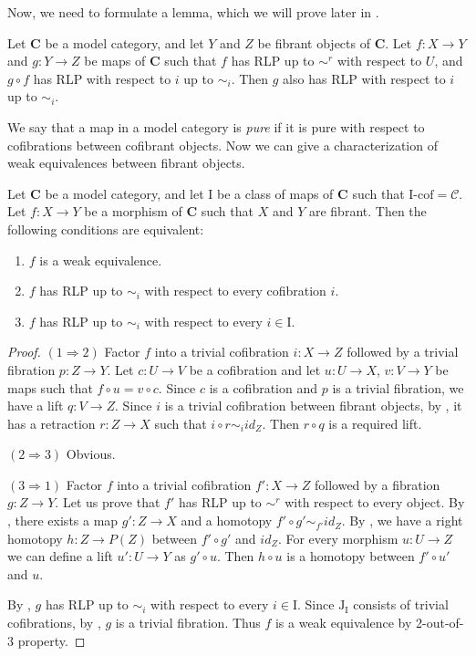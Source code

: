 \documentclass{amsart}
\theoremstyle{definition}
\newcommand{\cof}{\mathcal{C}}
\newcommand{\cat}[1]{\mathbf{#1}}
\newcommand{\C}{\cat{C}}
\newcommand{\I}{\mathrm{I}}
\newcommand{\J}{\mathrm{J}}
\newcommand{\class}[2]{#1\text{-}\mathrm{#2}}
\newcommand{\Icof}[1][\I]{\class{#1}{cof}}
\begin{document}
Now, we need to formulate a lemma, which we will prove later in .

\begin{lem}
Let $\C$ be a model category, and let $Y$ and $Z$ be fibrant objects of $\C$.
Let $f : X \to Y$ and $g : Y \to Z$ be maps of $\C$ such that $f$ has RLP up to $\sim^r$ with respect to $U$, and $g \circ f$ has RLP with respect to $i$ up to $\sim_i$.
Then $g$ also has RLP with respect to $i$ up to $\sim_i$.
\end{lem}

We say that a map in a model category is \emph{pure} if it is pure with respect to cofibrations between cofibrant objects.
Now we can give a characterization of weak equivalences between fibrant objects.

\begin{prop}[min-we]
Let $\C$ be a model category, and let $\I$ be a class of maps of $\C$ such that $\Icof = \cof$.
Let $f : X \to Y$ be a morphism of $\C$ such that $X$ and $Y$ are fibrant.
Then the following conditions are equivalent:
\begin{enumerate}
\item $f$ is a weak equivalence.
\item $f$ has RLP up to $\sim_i$ with respect to every cofibration $i$.
\item $f$ has RLP up to $\sim_i$ with respect to every $i \in \I$.
\end{enumerate}
\end{prop}
\begin{proof}
$(1 \Rightarrow 2)$
Factor $f$ into a trivial cofibration $i : X \to Z$ followed by a trivial fibration $p : Z \to Y$.
Let $c : U \to V$ be a cofibration and let $u : U \to X$, $v : V \to Y$ be maps such that $f \circ u = v \circ c$.
Since $c$ is a cofibration and $p$ is a trivial fibration, we have a lift $q : V \to Z$.
Since $i$ is a trivial cofibration between fibrant objects, by , it has a retraction $r : Z \to X$ such that $i \circ r \sim_i id_Z$.
Then $r \circ q$ is a required lift.

$(2 \Rightarrow 3)$ Obvious.

$(3 \Rightarrow 1)$
Factor $f$ into a trivial cofibration $f' : X \to Z$ followed by a fibration $g : Z \to Y$.
Let us prove that $f'$ has RLP up to $\sim^r$ with respect to every object.
By , there exists a map $g' : Z \to X$ and a homotopy $f' \circ g' \sim_{f'} id_Z$.
By , we have a right homotopy $h : Z \to P(Z)$ between $f' \circ g'$ and $id_Z$.
For every morphism $u : U \to Z$ we can define a lift $u' : U \to Y$ as $g' \circ u$.
Then $h \circ u$ is a homotopy between $f' \circ u'$ and $u$.

By , $g$ has RLP up to $\sim_i$ with respect to every $i \in \I$.
Since $\J_\I$ consists of trivial cofibrations, by , $g$ is a trivial fibration.
Thus $f$ is a weak equivalence by 2-out-of-3 property.
\end{proof}
\end{document}
